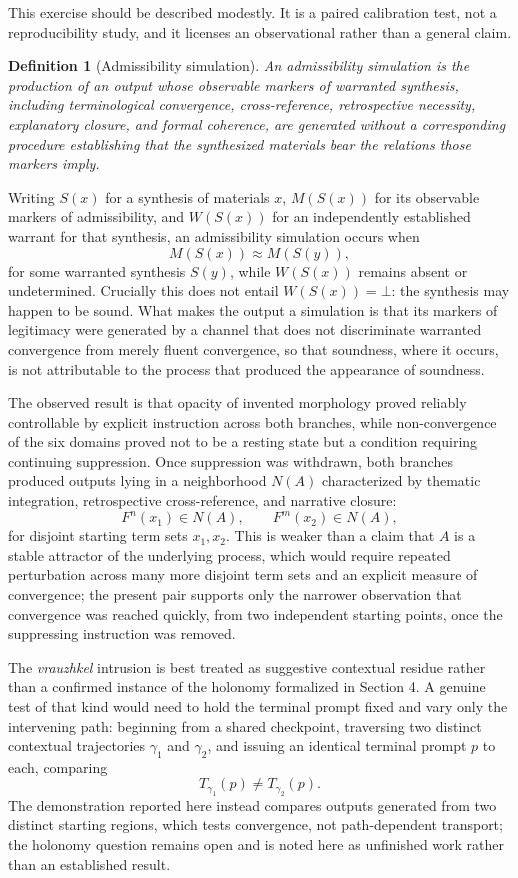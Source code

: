\documentclass[11pt]{article}
\newtheorem{definition}{Definition}
\begin{document}
This exercise should be described modestly. It is a paired calibration test, not a reproducibility study, and it licenses an observational rather than a general claim.

\begin{definition}[Admissibility simulation]
An \emph{admissibility simulation} is the production of an output whose observable markers of warranted synthesis, including terminological convergence, cross-reference, retrospective necessity, explanatory closure, and formal coherence, are generated without a corresponding procedure establishing that the synthesized materials bear the relations those markers imply.
\end{definition}

Writing $S(x)$ for a synthesis of materials $x$, $M(S(x))$ for its observable markers of admissibility, and $W(S(x))$ for an independently established warrant for that synthesis, an admissibility simulation occurs when
\[
M(S(x)) \approx M(S(y)),
\]
for some warranted synthesis $S(y)$, while $W(S(x))$ remains absent or undetermined. Crucially this does not entail $W(S(x)) = \bot$: the synthesis may happen to be sound. What makes the output a simulation is that its markers of legitimacy were generated by a channel that does not discriminate warranted convergence from merely fluent convergence, so that soundness, where it occurs, is not attributable to the process that produced the appearance of soundness.

The observed result is that opacity of invented morphology proved reliably controllable by explicit instruction across both branches, while non-convergence of the six domains proved not to be a resting state but a condition requiring continuing suppression. Once suppression was withdrawn, both branches produced outputs lying in a neighborhood $N(A)$ characterized by thematic integration, retrospective cross-reference, and narrative closure:
\[
F^{n}(x_1) \in N(A), \qquad F^{m}(x_2) \in N(A),
\]
for disjoint starting term sets $x_1, x_2$. This is weaker than a claim that $A$ is a stable attractor of the underlying process, which would require repeated perturbation across many more disjoint term sets and an explicit measure of convergence; the present pair supports only the narrower observation that convergence was reached quickly, from two independent starting points, once the suppressing instruction was removed.

The \emph{vrauzhkel} intrusion is best treated as suggestive contextual residue rather than a confirmed instance of the holonomy formalized in Section 4. A genuine test of that kind would need to hold the terminal prompt fixed and vary only the intervening path: beginning from a shared checkpoint, traversing two distinct contextual trajectories $\gamma_1$ and $\gamma_2$, and issuing an identical terminal prompt $p$ to each, comparing
\[
T_{\gamma_1}(p) \neq T_{\gamma_2}(p).
\]
The demonstration reported here instead compares outputs generated from two distinct starting regions, which tests convergence, not path-dependent transport; the holonomy question remains open and is noted here as unfinished work rather than an established result.
\end{document}

